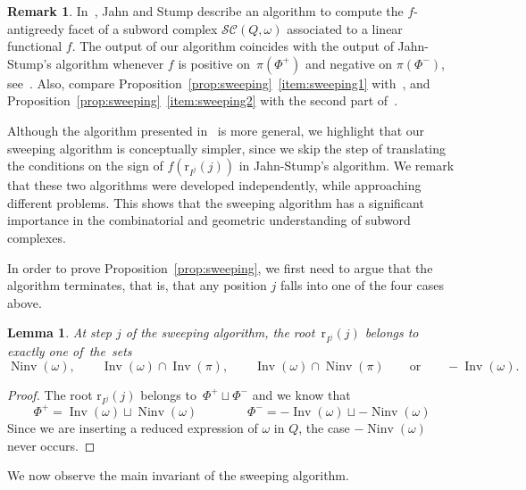 \documentclass[reqno]{amsart}
\newtheorem{lemma}[theorem]{Lemma}
\theoremstyle{definition}
\newtheorem{remark}[theorem]{Remark}
\DeclareMathOperator{\Inv}{Inv} %
\DeclareMathOperator{\Ninv}{Ninv} %
\newcommand{\subwordComplex}{\mathcal{SC}} %
\newcommand{\rootFunction}[2]{\mathrm{r}_{#1}(#2)} %
\begin{document}
\begin{remark}\label{rem_sweepJahnStump}
In~\cite[Section~3.3]{JahnStump}, Jahn and Stump describe an algorithm to compute the $f$-antigreedy facet of a subword complex $\subwordComplex(Q,\omega)$ associated to a linear functional $f$.  
The output of our algorithm coincides with the output of Jahn-Stump's algorithm whenever $f$ is positive on~$\pi(\Phi^+)$ and negative on $\pi(\Phi^-)$, see~\cite[Proposition~4.12]{JahnStump}.
Also, compare Proposition~\ref{prop:sweeping}~\eqref{item:sweeping1} with~\cite[Theorem~3.17 (a)]{JahnStump},
and Proposition~\ref{prop:sweeping}~\eqref{item:sweeping2} with the second part of~\cite[Proposition~4.12]{JahnStump}.

Although the algorithm presented in~\cite{JahnStump} is more general, we highlight that our sweeping algorithm is conceptually simpler, since we skip the step of translating the conditions on the sign of $f(\rootFunction{I^j}{j})$ in Jahn-Stump's algorithm. We remark that these two algorithms were developed independently, while approaching different problems. This shows that the sweeping algorithm has a significant importance in the combinatorial and geometric understanding of subword complexes.  
\end{remark}

In order to prove Proposition~\ref{prop:sweeping}, we first need to argue that the algorithm terminates, that is, that any position $j$ falls into one of the four cases above.

\begin{lemma}
\label{lem:sweeping1}
At step $j$ of the sweeping algorithm, the root~$\rootFunction{I^j}{j}$ belongs to exactly one of~the~sets
\[
\Ninv(\omega),
\qquad
\Inv(\omega) \cap \Inv(\pi),
\qquad
\Inv(\omega) \cap \Ninv(\pi)
\qquad\text{or}\qquad
-\Inv(\omega).
\]
\end{lemma}

\begin{proof}
The root $\rootFunction{I^j}{j}$ belongs to~$\Phi^+ \sqcup \Phi^-$ and we know that
\[
\Phi^+ = \Inv(\omega) \sqcup \Ninv(\omega) \qquad \qquad
\Phi^- = -\Inv(\omega) \sqcup -\Ninv(\omega)  
\]
Since we are inserting a reduced expression of $\omega$ in $Q$, the case $-\Ninv(\omega)$ never occurs.
\end{proof}

We now observe the main invariant of the sweeping algorithm.
\end{document}
